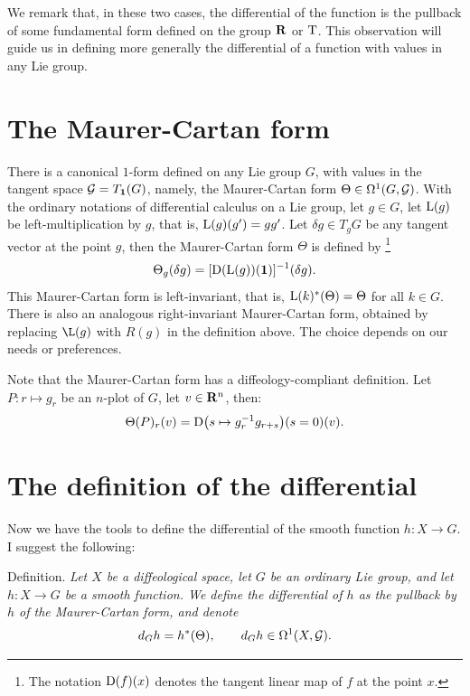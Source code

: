 We remark that,
in these two cases,
the differential of the function is the pullback of some fundamental form defined on the group $\mathbf{R}$ or $\mathrm{T}$.
This observation will guide us in defining more generally the differential of a function with values in any Lie group.


\section{The Maurer-Cartan form}

There is a canonical $1$-form defined on any Lie group $G$,
with values in the tangent space $\mathcal{G} = T_{\mathbf{1}}(G)$,
namely,
the Maurer-Cartan form $\Theta \in \Omega^1(G,\mathcal{G})$.
With the ordinary notations of differential calculus on a Lie group,
let $g \in G$,
let $\operatorname{L}(g)$ be left-multiplication by $g$,
that is,
$\operatorname{L}(g)(g') = gg'$.
Let $\delta g \in T_g G$
be any tangent vector at the point $g$,
then the Maurer-Cartan form $\Theta$ is defined by%
\footnote{The notation $\operatorname{D}(f)(x)$ denotes the tangent linear map of $f$ at the point $x$.}
$$
  \Theta_g(\delta g) = [\operatorname{D}(\operatorname{L}(g))({\mathbf{1}})]^{-1}(\delta g).
$$
This Maurer-Cartan form is left-invariant,
that is,
$\operatorname{L}(k)^*(\Theta) = \Theta$ for all $k \in G$.
There is also an analogous right-invariant Maurer-Cartan form,
obtained by replacing $\L(g)$ with $R(g)$ in the definition above.
The choice depends on our needs or preferences.

Note that the Maurer-Cartan form has a diffeology-compliant definition.
Let $P : r \mapsto g_r$ be an $n$-plot of $G$,
let $v \in \mathbf{R}^n$,
then:
$$
  \Theta(P)_r(v) = \operatorname{D}\!\left(s \mapsto g_r^{-1} g_{r+s}\right)\!(s=0)(v).
$$


\section{The definition of the differential}

Now we have the tools to define the differential of the smooth function $h : X \to G$.
I suggest the following:

\begin{Article}{Definition.}{\itshape
  Let $X$ be a diffeological space,
  let $G$ be an ordinary Lie group,
  and let $h : X \to G$ be a smooth function.
  We define the {\em differential} of $h$ as the pullback by $h$ of the Maurer-Cartan form,
  and denote
  $$
    d_G h = h^*(\Theta),
    \qquad
    d_G h \in \Omega^1(X,\mathcal{G}).
  $$
}
\end{Article}

